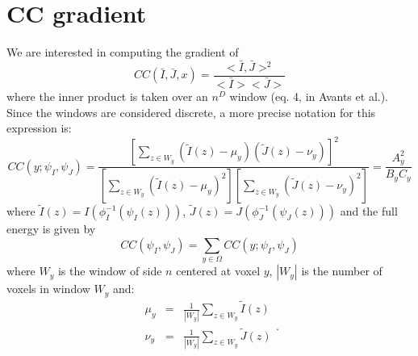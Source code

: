 \section{CC gradient}
We are interested in computing the gradient of
\begin{equation}
    CC(\bar{I}, \bar{J}, x) = \frac{<\bar{I}, \bar{J}>^{2}}{<\bar{I}><\bar{J}>}
\end{equation}
where the inner product is taken over an $n^{D}$ window (eq. 4, in Avants et al.\cite{Avants2008}). Since the windows are considered discrete, a more precise notation
for this expression is:
\begin{equation}
    CC(y;\psi_{I}, \psi_{J}) = \frac{\left[\sum_{z\in W_{y}} \left(\tilde{I}(z) - \mu_{y}\right)\left(\tilde{J}(z) - \nu_{y}\right)\right]^{2}}
    {\left[\sum_{z \in W_{y}}\left(\tilde{I}(z) - \mu_{y}\right)^{2}\right] \left[\sum_{z \in W_{y}}\left(\tilde{J}(z) - \nu_{y}\right)^{2}\right]} = \frac{A_{y}^{2}}{B_{y}C_{y}}
\end{equation}
where $\tilde{I}(z) = I(\phi_{I}^{-1}(\psi_{I}(z)))$, $\tilde{J}(z) = J(\phi_{J}^{-1}(\psi_{J}(z)))$ and the full energy is given by
\begin{equation}
    CC(\psi_{I}, \psi_{J}) = \sum_{y\in\Omega} CC(y; \psi_{I}, \psi_{J})
\end{equation}
where $W_{y}$ is the window of side $n$ centered at voxel $y$, $|W_{y}|$ is the number of voxels in window $W_{y}$ and:
\begin{equation}
    \begin{array}{lll}
        \mu_{y} &=& \frac{1}{|W_{y}|}\sum_{z \in W_{y}}\tilde{I}(z)\\
        \nu_{y} &=& \frac{1}{|W_{y}|}\sum_{z \in W_{y}}\tilde{J}(z)\\
    \end{array}.
\end{equation}

